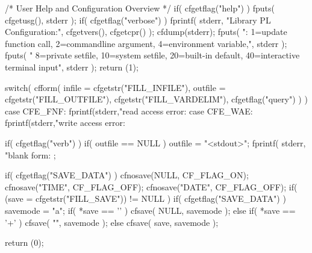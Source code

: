 \begin{DoxyCodeInclude}
{    /* User Help and Configuration Overview */
    if( cfgetflag("help") ){
        fputs( cfgetusg(), stderr );
        if( cfgetflag("verbose") ){
            fprintf( stderr, "\nConfiguration Library PL %
       Configuration:\n\n",
                             cfgetvers(), cfgetcpr() );
            cfdump(stderr);
            fputs( "\nSources: 1=update function call, 2=commandline argument,
       4=environment variable,\n", stderr );
            fputs(   "         8=private setfile, 10=system setfile,
       20=built-in default, 40=interactive terminal input\n", stderr );
        }
        return (1);
    }

    switch(
        cfform( infile = cfgetstr("FILL_INFILE"),
                outfile = cfgetstr("FILL_OUTFILE"),
                cfgetstr("FILL_VARDELIM"),
                cfgetflag("query") )
    ){
        case CFE_FNF:
            fprintf(stderr,"read access error: %
        case CFE_WAE:
            fprintf(stderr,"write access error: %
    }

    if( cfgetflag("verb") ){
        if( outfile == NULL ) outfile = "<stdout>";
        fprintf( stderr, "blank form: %
      ;
    }

    if( cfgetflag("SAVE_DATA") ){
        cfnosave(NULL, CF_FLAG_ON);
        cfnosave("TIME", CF_FLAG_OFF);
        cfnosave("DATE", CF_FLAG_OFF);
    }
    if( (save = cfgetstr("FILL_SAVE")) != NULL ){
        if( cfgetflag("SAVE_DATA") ) savemode = "a";
        if( *save == '\0' )
            cfsave( NULL, savemode );
        else if( *save == '+' )
            cfsave( "", savemode );
        else
            cfsave( save, savemode );
    }

    return (0);
}
\end{DoxyCodeInclude}
 